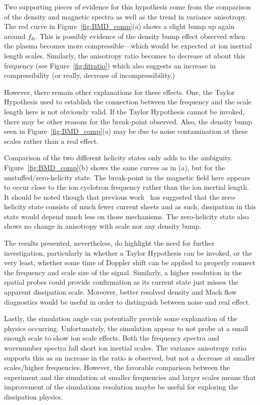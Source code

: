 \documentclass[aip,prl,amsmath,amssymb,reprint,superscriptaddress]{revtex4-1} %
\begin{document}
Two supporting pieces of evidence for this hypothesis come from the comparison of the density and magnetic spectra as well as the trend in variance anisotropy. The red curve in Figure~\ref{fig:BMD_comp}(a) shows a slight bump up again around $f_{\delta i}$. This is possibly evidence of the density bump effect observed when the plasma becomes more compressible---which would be expected at ion inertial length scales. Similarly, the anisotropy ratio becomes to decrease at about this frequency (see Figure~\ref{fig:fitratio}) which also suggests an increase in compressibility (or really, decrease of incompressibility.)

However, there remain other explanations for these effects. One, the Taylor Hypothesis used to establish the connection between the frequency and the scale length here is not obviously valid. If the Taylor Hypothesis cannot be invoked, there may be other reasons for the break-point observed. Also, the density bump seen in Figure~\ref{fig:BMD_comp}(a) may be due to noise contamination at these scales rather than a real effect.

Comparison of the two different helicity states only adds to the ambiguity. Figure~\ref{fig:BMD_comp}(b) shows the same curves as in (a), but for the unstuffed/zero-helicity state. The break-point in the magnetic field here appears to occur close to the ion cyclotron frequency rather than the ion inertial length. It should be noted though that previous work~\cite{schaffner14b} has suggested that the zero-helicity state consists of much fewer current sheets and as such, dissipation in this state would depend much less on those mechanisms. The zero-helicity state also shows no change in anisotropy with scale nor any density bump.

The results presented, nevertheless, do highlight the need for further investigation, particularly in whether a Taylor Hypothesis can be invoked, or the very least, whether some time of Doppler shift can be applied to properly connect the frequency and scale size of the signal. Similarly, a higher resolution in the spatial probes could provide confirmation as its current state just misses the apparent dissipation scale. Moreover, better resolved density and Mach flow diagnostics would be useful in order to distinguish between noise and real effect.

Lastly, the simulation angle can potentially provide some explanation of the physics occurring. Unfortunately, the simulation appear to not probe at a small enough scale to show ion scale effects. Both the frequency spectra and wavenumber spectra fall short ion inertial scales. The variance anisotropy ratio supports this as an increase in the ratio is observed, but not a decrease at smaller scales/higher frequencies. However, the favorable comparison between the experiment and the simulation at smaller frequencies and larger scales means that improvement of the simulations resolution maybe be useful for exploring the dissipation physics.
\end{document}
